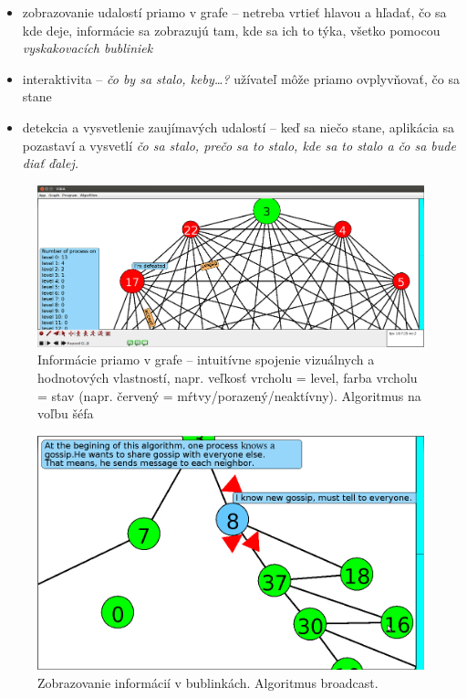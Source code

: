 
\begin{itemize}
    \item zobrazovanie udalostí priamo v grafe -- netreba vrtieť hlavou a hľadať, čo sa kde deje,
    informácie sa zobrazujú tam, kde sa ich to týka, všetko pomocou \emph{vyskakovacích bubliniek}
    \item interaktivita -- \emph{čo by sa stalo, keby\dots?} užívateľ môže priamo ovplyvňovať, čo sa
    stane
    \item detekcia a vysvetlenie zaujímavých udalostí -- keď sa niečo stane, aplikácia sa pozastaví
    a vysvetlí 
    \emph{čo sa stalo, prečo sa to stalo, kde sa to stalo a čo sa bude diať ďalej.}
\end{itemize}

\begin{figure}
\includegraphics[width=\columnwidth]{le}
\vspace{-1cm}
\caption{Informácie priamo v grafe -- intuitívne spojenie vizuálnych a hodnotových
vlastností, napr. veľkosť vrcholu = level, farba vrcholu = stav (napr. červený =
mŕtvy/porazený/neaktívny). Algoritmus na voľbu šéfa}
\end{figure}


\begin{figure}
\vspace{-1cm}
\includegraphics[width=\columnwidth]{bfs}
\vspace{-1cm}
\caption{Zobrazovanie informácií v bublinkách. Algoritmus broadcast.}
\vspace{-1cm}
\end{figure}

